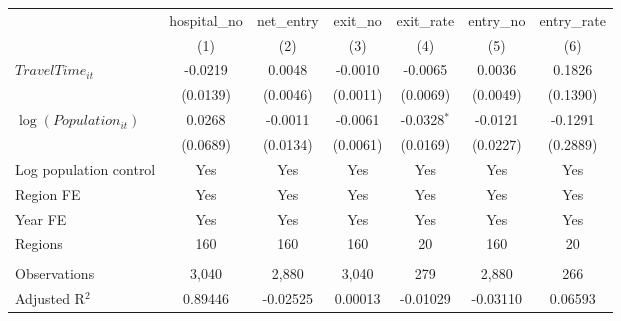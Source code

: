 \begingroup
\centering
\begin{tabular}{lcccccc}
   \toprule
                            & hospital\_no  & net\_entry  & exit\_no  & exit\_rate    & entry\_no  & entry\_rate \\    
                            & (1)           & (2)         & (3)       & (4)           & (5)        & (6)\\  
   \midrule 
   $TravelTime_{it}$        & -0.0219       & 0.0048      & -0.0010   & -0.0065       & 0.0036     & 0.1826\\   
                            & (0.0139)      & (0.0046)    & (0.0011)  & (0.0069)      & (0.0049)   & (0.1390)\\   
   $\log(Population_{it})$  & 0.0268        & -0.0011     & -0.0061   & -0.0328$^{*}$ & -0.0121    & -0.1291\\   
                            & (0.0689)      & (0.0134)    & (0.0061)  & (0.0169)      & (0.0227)   & (0.2889)\\   
   Log population control   & Yes           & Yes         & Yes       & Yes           & Yes        & Yes\\  
   Region FE                & Yes           & Yes         & Yes       & Yes           & Yes        & Yes\\  
   Year FE                  & Yes           & Yes         & Yes       & Yes           & Yes        & Yes\\  
   Regions                  & 160           & 160         & 160       & 20            & 160        & 20\\  
    \\
   Observations             & 3,040         & 2,880       & 3,040     & 279           & 2,880      & 266\\  
   Adjusted R$^2$           & 0.89446       & -0.02525    & 0.00013   & -0.01029      & -0.03110   & 0.06593\\  
   \bottomrule
\end{tabular}
\par\endgroup
